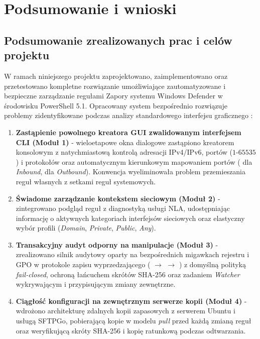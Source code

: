 \chapter{Podsumowanie i wnioski}\label{ch:podsumowanie}

\section{Podsumowanie zrealizowanych prac i celów projektu}\label{sec:podsumowanie-prac}

W ramach niniejszego projektu zaprojektowano, zaimplementowano oraz przetestowano kompletne rozwiązanie umożliwiające zautomatyzowane i bezpieczne zarządzanie regułami Zapory systemu Windows Defender w środowisku PowerShell 5.1. Opracowany system bezpośrednio rozwiązuje problemy zidentyfikowane podczas analizy standardowego interfejsu graficznego :

\begin{enumerate}
    \item \textbf{Zastąpienie powolnego kreatora GUI zwalidowanym interfejsem CLI (Moduł 1)} - wieloetapowe okna dialogowe zastąpiono kreatorem konsolowym z natychmiastową kontrolą adresacji IPv4/IPv6, portów ($1\text{-}65535$) i protokołów oraz automatycznym kierunkowym mapowaniem portów ( dla \textit{Inbound},  dla \textit{Outbound}). Konwencja  wyeliminowała problem przemieszania reguł własnych z setkami reguł systemowych.
    \item \textbf{Świadome zarządzanie kontekstem sieciowym (Moduł 2)} - zintegrowano podgląd reguł z diagnostyką usługi NLA, udostępniając informację o aktywnych kategoriach interfejsów sieciowych oraz elastyczny wybór profili (\textit{Domain}, \textit{Private}, \textit{Public}, \textit{Any}).
    \item \textbf{Transakcyjny audyt odporny na manipulacje (Moduł 3)} - zrealizowano silnik audytowy oparty na bezpośrednich migawkach rejestru i GPO w protokole zapisu wyprzedzającego ( $\rightarrow$  $\rightarrow$ ) z domyślną polityką \textit{fail-closed}, ochroną łańcuchem skrótów SHA-256 oraz zadaniem \textit{Watcher} wykrywającym i przypisującym zmiany zewnętrzne.
    \item \textbf{Ciągłość konfiguracji na zewnętrznym serwerze kopii (Moduł 4)} - wdrożono architekturę zdalnych kopii zapasowych z serwerem Ubuntu i usługą SFTPGo, pobierającą kopie  w modelu \textit{pull} przed każdą zmianą reguł oraz weryfikującą skróty SHA-256 i kopię ratunkową  podczas odtwarzania.
\end{enumerate}

